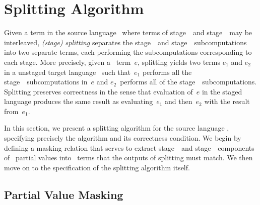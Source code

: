 \section{Splitting Algorithm}
\label{sec:splitting}

Given a term in the source language \lang\ where terms of
stage~\bbone\ and stage~\bbtwo\ may be interleaved, \emph{(stage)
  splitting} separates the stage~\bbone\ and stage~\bbtwo\
subcomputations into two separate terms, each performing the
subcomputations corresponding to each stage.  More precisely, given a
\lang\ term~$e$, splitting yields two terms $e_1$ and $e_2$ in a
unstaged target language \langmono\ such that~$e_1$ performs all the
stage~\bbone\ subcomputations in~$e$ and $e_2$~performs all of the
stage~\bbtwo\ subcomputations. Splitting preserves correctness in the sense that evaluation of~$e$ in
the staged language produces the same result as evaluating~$e_1$ and 
then~$e_2$ with the result from~$e_1$.

In this section, we present a
splitting algorithm for the source language \lang, specifying
precisely the algorithm and its correctness condition.  
We begin by defining a masking relation that serves to extract stage~\bbone\ and
stage~\bbtwo\ components of \lang\ partial values into \langmono\ terms that the outputs of splitting must match. We then 
move on to the specification of the splitting algorithm itself.


\subsection{Partial Value Masking}





%

